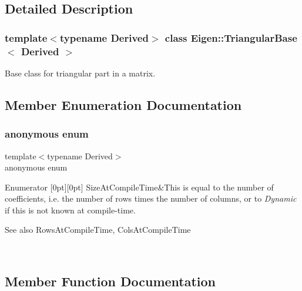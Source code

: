 \subsection{Detailed Description}
\subsubsection*{template$<$typename Derived$>$\newline
class Eigen\+::\+Triangular\+Base$<$ Derived $>$}

Base class for triangular part in a matrix. 

\subsection{Member Enumeration Documentation}
\mbox{\label{class_eigen_1_1_triangular_base_a2530a08c81539f645aee0c25aaf0f8a3}} 
\subsubsection{\texorpdfstring{anonymous enum}{anonymous enum}}
{\footnotesize\ttfamily template$<$typename Derived$>$ \\
anonymous enum}

\begin{DoxyEnumFields}{Enumerator}
[0pt][0pt]{}\mbox{\label{class_eigen_1_1_triangular_base_a2530a08c81539f645aee0c25aaf0f8a3a41d03efb5f764a9e647974c83581ca0e}} 
Size\+At\+Compile\+Time&This is equal to the number of coefficients, i.\+e. the number of rows times the number of columns, or to {\itshape Dynamic} if this is not known at compile-\/time. \begin{DoxySeeAlso}{See also}
Rows\+At\+Compile\+Time, Cols\+At\+Compile\+Time 
\end{DoxySeeAlso}
\\
\hline

\end{DoxyEnumFields}


\subsection{Member Function Documentation}
\mbox{\label{class_eigen_1_1_triangular_base_ae93491f8454e133ff48202bf7c0c59e7}} 
